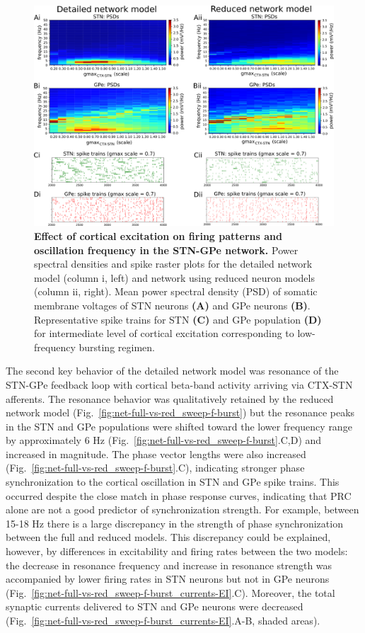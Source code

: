 \begin{figure}[ht]
\centering
\includegraphics[width=\textwidth]{ch_reduced_model/figs/fig_net-full-vs-red_sweep-g-ctx-stn_spont.png}
\caption{
\textbf{Effect of cortical excitation on firing patterns and oscillation frequency in the STN-GPe network.}
Power spectral densities and spike raster plots for the detailed network model (column i, left) and network using reduced neuron models (column ii, right). Mean power spectral density (PSD) of somatic membrane voltages of STN neurons \textbf{(A)} and GPe neurons \textbf{(B)}. Representative spike trains for STN \textbf{(C)} and GPe population \textbf{(D)} for intermediate level of cortical excitation corresponding to low-frequency bursting regimen.
}
\label{fig:net-full-vs-red_spont_sweep-g-ctx-stn}
\end{figure}

%
%

The second key behavior of the detailed network model was resonance of the STN-GPe feedback loop
with cortical beta-band activity arriving via CTX-STN afferents.
The resonance behavior was qualitatively retained by the reduced network model
(Fig.~\ref{fig:net-full-vs-red_sweep-f-burst}) but the resonance peaks in the STN and GPe
populations were shifted toward the lower frequency range by approximately 6 Hz (Fig.~\ref{fig:net-full-vs-red_sweep-f-burst}.C,D) and increased in magnitude.
%
The phase vector lengths were also increased (Fig.~\ref{fig:net-full-vs-red_sweep-f-burst}.C),
indicating stronger phase synchronization to the cortical oscillation in STN and GPe spike trains.
This occurred despite the close match in phase response curves, indicating that
PRC alone are not a good predictor of synchronization strength. For example, between 15-18 Hz
there is a large discrepancy in the strength of phase synchronization between the full
and reduced models. This discrepancy could be explained, however, by differences in
excitability and firing rates between the two models:
the decrease in resonance frequency and increase in resonance strength was
accompanied by lower firing rates in STN neurons but not in GPe neurons (Fig.~\ref{fig:net-full-vs-red_sweep-f-burst_currents-EI}.C). Moreover, the
total synaptic currents delivered to STN and GPe neurons were decreased (Fig.~\ref{fig:net-full-vs-red_sweep-f-burst_currents-EI}.A-B, shaded areas).

